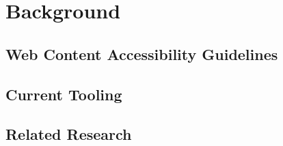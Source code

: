 \chapter{Background}\label{cha:background}


\section{Web Content Accessibility Guidelines}

\section{Current Tooling}

\section{Related Research}